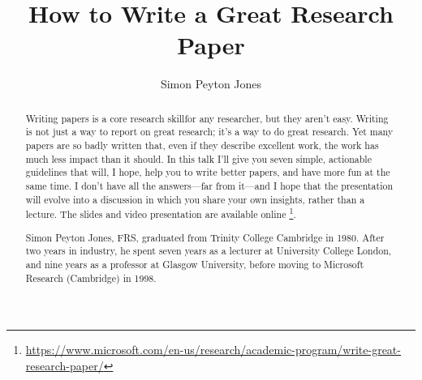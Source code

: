\documentclass[a4paper,UKenglish]{oasics-v2016}
\title{How to Write a Great Research Paper}
\author{Simon Peyton Jones}
\affil{Microsoft Research Cambridge}
\begin{document}
\maketitle
\begin{abstract}
Writing papers is a core research skillfor any researcher, but they aren’t easy. Writing is not just a way to report on great research; it’s a way to do great research. Yet many papers are so badly written that, even if they describe excellent work, the work has much less impact than it should. In this talk I’ll give you seven simple, actionable guidelines that will, I hope, help you to write better papers, and have more fun at the same time. I don’t have all the answers—far from it—and I hope that the presentation will evolve into a discussion in which you share your own insights, rather than a lecture. The slides and video presentation are available online \footnote{\url{https://www.microsoft.com/en-us/research/academic-program/write-great-research-paper/}}.

Simon Peyton Jones, FRS, graduated from Trinity College Cambridge in 1980. After two years in industry, he spent seven years as a lecturer at University College London, and nine years as a professor at Glasgow University, before moving to Microsoft Research (Cambridge) in 1998.
\end{abstract}
\end{document}
